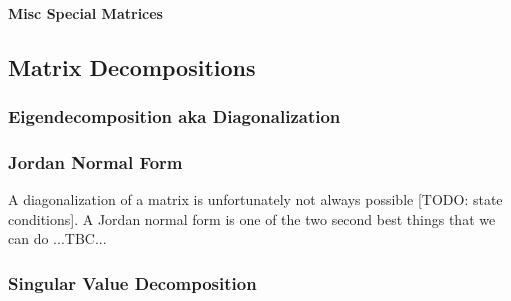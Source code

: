 




\paragraph{Misc Special Matrices}










\subsection{Matrix Decompositions}


\subsubsection{Eigendecomposition aka Diagonalization}



\subsubsection{Jordan Normal Form}
A diagonalization of a matrix is unfortunately not always possible [TODO: state conditions]. A Jordan normal form is one of the two second best things that we can do ...TBC...


\subsubsection{Singular Value Decomposition}



